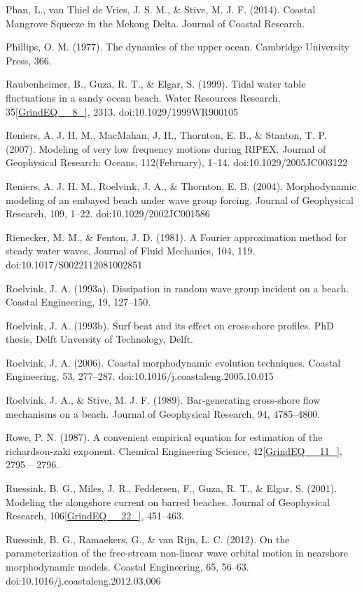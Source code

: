 \documentclass{article}
\begin{document}
\noindent Phan, L., van Thiel de Vries, J. S. M., \& Stive, M. J. F. (2014). Coastal Mangrove Squeeze in the Mekong Delta. Journal of Coastal Research.

\noindent Phillips, O. M. (1977). The dynamics of the upper ocean. Cambridge University Press, 366.

\noindent Raubenheimer, B., Guza, R. T., \& Elgar, S. (1999). Tidal water table fluctuations in a sandy ocean beach. Water Resources Research, 35\eqref{GrindEQ__8_}, 2313. doi:10.1029/1999WR900105

\noindent Reniers, A. J. H. M., MacMahan, J. H., Thornton, E. B., \& Stanton, T. P. (2007). Modeling of very low frequency motions during RIPEX. Journal of Geophysical Research: Oceans, 112(February), 1--14. doi:10.1029/2005JC003122

\noindent Reniers, A. J. H. M., Roelvink, J. A., \& Thornton, E. B. (2004). Morphodynamic modeling of an embayed beach under wave group forcing. Journal of Geophysical Research, 109, 1--22. doi:10.1029/2002JC001586

\noindent Rienecker, M. M., \& Fenton, J. D. (1981). A Fourier approximation method for steady water waves. Journal of Fluid Mechanics, 104, 119. doi:10.1017/S0022112081002851

\noindent Roelvink, J. A. (1993a). Dissipation in random wave group incident on a beach. Coastal Engineering, 19, 127--150.

\noindent Roelvink, J. A. (1993b). Surf beat and its effect on cross-shore profiles. PhD thesis, Delft Unversity of Technology, Delft.

\noindent Roelvink, J. A. (2006). Coastal morphodynamic evolution techniques. Coastal Engineering, 53, 277--287. doi:10.1016/j.coastaleng.2005.10.015

\noindent Roelvink, J. A., \& Stive, M. J. F. (1989). Bar-generating cross-shore flow mechanisms on a beach. Journal of Geophysical Research, 94, 4785--4800.

\noindent Rowe, P. N. (1987). A convenient empirical equation for estimation of the richardson-zaki exponent. Chemical Engineering Science, 42\eqref{GrindEQ__11_}, 2795 -- 2796.

\noindent Ruessink, B. G., Miles, J. R., Feddersen, F., Guza, R. T., \& Elgar, S. (2001). Modeling the alongshore current on barred beaches. Journal of Geophysical Research, 106\eqref{GrindEQ__22_}, 451--463.

\noindent Ruessink, B. G., Ramaekers, G., \& van Rijn, L. C. (2012). On the parameterization of the free-stream non-linear wave orbital motion in nearshore morphodynamic models. Coastal Engineering, 65, 56--63. doi:10.1016/j.coastaleng.2012.03.006
\end{document}
